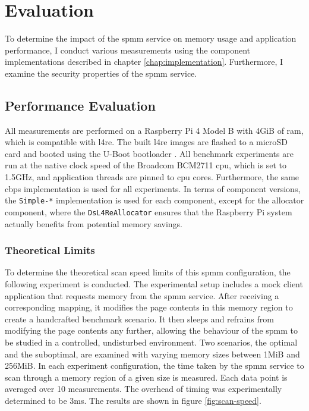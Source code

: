 \chapter{Evaluation}
\label{chap:evaluation}

To determine the impact of the \ac{spmm} service on memory usage and application performance, I conduct various measurements using the component implementations described in chapter \ref{chap:implementation}.
Furthermore, I examine the security properties of the \ac{spmm} service.

\section{Performance Evaluation}
\label{sec:performance-evaluation}

All measurements are performed on a Raspberry Pi 4 Model B with 4GiB of \acs{ram}, which is compatible with \ac{l4re}.
The built \ac{l4re} images are flashed to a microSD card and booted using the U-Boot bootloader \cite{u-boot}.
All benchmark experiments are run at the native clock speed of the Broadcom BCM2711 \acs{cpu}, which is set to 1.5GHz, and application threads are pinned to \acs{cpu} cores.
Furthermore, the same \ac{cbps} implementation is used for all experiments.
In terms of component versions, the \texttt{Simple-*} implementation is used for each component, except for the allocator component, where the \texttt{Ds\-L4Re\-Allocator} ensures that the Raspberry Pi system actually benefits from potential memory savings.

\subsection{Theoretical Limits}
\label{subsec:theoretical-limits}

To determine the theoretical scan speed limits of this \ac{spmm} configuration, the following experiment is conducted.
The experimental setup includes a mock client application that requests memory from the \ac{spmm} service.
After receiving a corresponding mapping, it modifies the page contents in this memory region to create a handcrafted benchmark scenario.
It then sleeps and refrains from modifying the page contents any further, allowing the behaviour of the \ac{spmm} to be studied in a controlled, undisturbed environment.
Two scenarios, the optimal and the suboptimal, are examined with varying memory sizes between 1MiB and 256MiB.
In each experiment configuration, the time taken by the \ac{spmm} service to scan through a memory region of a given size is measured.
Each data point is averaged over 10 measurements.
The overhead of timing was experimentally determined to be 3ms.
The results are shown in figure \ref{fig:scan-speed}.

